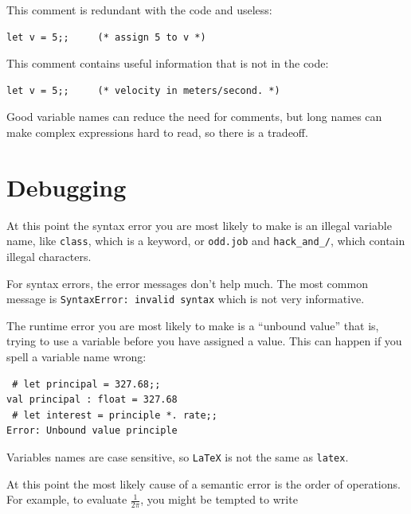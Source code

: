 \documentclass[10pt]{book}
\begin{document}
This comment is redundant with the code and useless:

\beforeverb
\begin{verbatim}
let v = 5;;     (* assign 5 to v *)
\end{verbatim}
\afterverb
%
This comment contains useful information that is not in the code:

\beforeverb
\begin{verbatim}
let v = 5;;     (* velocity in meters/second. *)
\end{verbatim}
\afterverb
%
Good variable names can reduce the need for comments, but
long names can make complex expressions hard to read, so there is
a tradeoff.

\section{Debugging}

At this point the syntax error you are most likely to make is
an illegal variable name, like {\tt class}, which
is a keyword, or \verb"odd.job" and \verb"hack_and_/", which contain
illegal characters.


For syntax errors, the error messages don't help much.
The most common message is {\tt SyntaxError: invalid 
syntax} which is not very informative.


The runtime error you are most likely to make is a ``unbound value'' that is,
trying to use a variable before you have assigned
a value.  This can happen if you spell a variable name wrong:

\beforeverb
\begin{verbatim}
 # let principal = 327.68;;
val principal : float = 327.68
 # let interest = principle *. rate;;
Error: Unbound value principle
\end{verbatim}
\afterverb

Variables names are case sensitive, so {\tt LaTeX} is not the
same as {\tt latex}.


At this point the most likely cause of a semantic error is
the order of operations.  For example, to evaluate $\frac{1}{2 \pi}$,
you might be tempted to write
\end{document}
